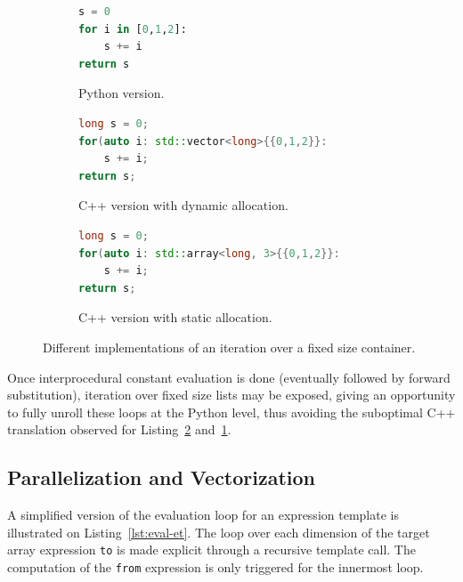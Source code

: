 \documentclass[10pt, preprint]{sigplanconf}
\begin{document}
\begin{figure}

    \begin{subfigure}{.5\textwidth}
    \begin{lstlisting}[language=python]
s = 0
for i in [0,1,2]:
    s += i
return s
\end{lstlisting}
\caption{Python version.}
\end{subfigure}

    \begin{subfigure}{.5\textwidth}
\begin{lstlisting}[language=c++]
long s = 0;
for(auto i: std::vector<long>{{0,1,2}}:
    s += i;
return s;
\end{lstlisting}
\caption{C++ version with dynamic allocation.}
\label{lst:dyna}
\end{subfigure}

    \begin{subfigure}{.5\textwidth}
\begin{lstlisting}[language=c++]
long s = 0;
for(auto i: std::array<long, 3>{{0,1,2}}:
    s += i;
return s;
\end{lstlisting}
\caption{C++ version with static allocation.}
\label{lst:stat}
\end{subfigure}

    \caption{Different implementations of an iteration over a fixed size container.}
    \label{fig:unroll-range}

\end{figure}

Once interprocedural constant evaluation is done (eventually followed by
forward substitution), iteration over fixed size lists may be exposed, giving an
opportunity to fully unroll these loops at the Python level, thus avoiding the
suboptimal C++ translation observed for Listing~\ref{lst:stat}
and~\ref{lst:dyna}.

\subsection{Parallelization and Vectorization}

A simplified version of the evaluation loop for an expression template is
illustrated on Listing~\ref{lst:eval-et}. The loop over each dimension of the
target array expression \texttt{to} is made explicit through a recursive
template call. The computation of the \texttt{from} expression is only triggered
for the innermost loop.
\end{document}
